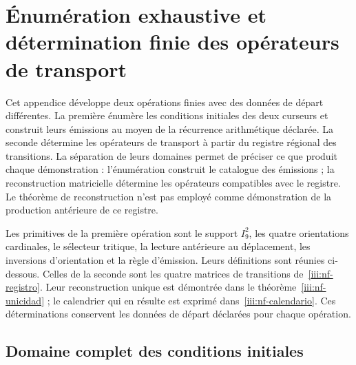 \section{Énumération exhaustive et détermination finie des opérateurs de transport}
\label{iii:nucleo-finito}

Cet appendice développe deux opérations finies avec des données de départ
différentes. La première énumère les conditions initiales des deux curseurs
et construit leurs émissions au moyen de la récurrence arithmétique déclarée.
La seconde détermine les opérateurs de transport à partir du registre
régional des transitions. La séparation de leurs domaines permet de préciser
ce que produit chaque démonstration : l’énumération construit le catalogue des
émissions ; la reconstruction matricielle détermine les opérateurs compatibles
avec le registre. Le théorème de reconstruction n’est pas employé comme démonstration
de la production antérieure de ce registre.

Les primitives de la première opération sont le support $I_9^2$, les quatre
orientations cardinales, le sélecteur tritique, la lecture antérieure au
déplacement, les inversions d’orientation et la règle d’émission.
Leurs définitions sont réunies ci-dessous. Celles de la seconde sont les
quatre matrices de transitions de~\eqref{iii:nf-registro}.
Leur reconstruction unique est démontrée dans le
théorème~\ref{iii:nf-unicidad} ; le calendrier qui en résulte est exprimé
dans~\eqref{iii:nf-calendario}. Ces déterminations conservent
les données de départ déclarées pour chaque opération.

\subsection{Domaine complet des conditions initiales}

